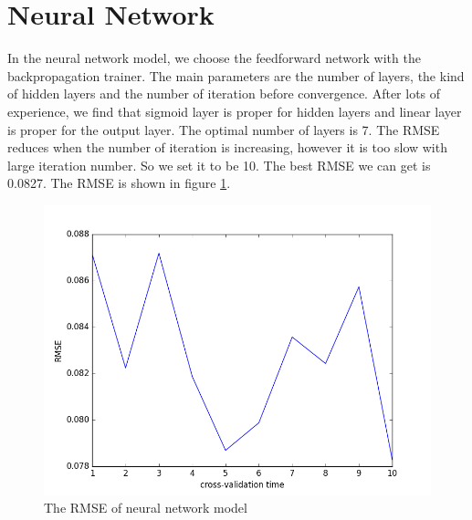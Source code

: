 \documentclass{article}
\begin{document}
\section{Neural Network}
In the neural network model, we choose the feedforward network with the backpropagation trainer. The main parameters are the number of layers, the kind of hidden layers and the number of iteration before convergence. After lots of experience, we find that sigmoid layer is proper for hidden layers and linear layer is proper for the output layer. The optimal number of layers is 7. The RMSE reduces when the number of iteration is increasing, however it is too slow with large iteration number. So we set it to be 10. The best RMSE we can get is 0.0827. The RMSE is shown in figure \ref{fig:nn}.
\begin{figure}[htbp]
\centering
\includegraphics[width=.6\textwidth]{nn.png}
\caption{The RMSE of neural network model}
\label{fig:nn}
\end{figure}
\end{document}
